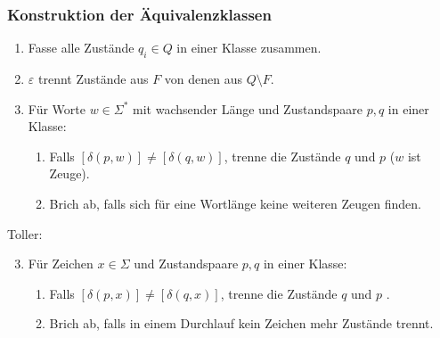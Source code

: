\begin{frame}
 \frametitle{Konstruktion der Äquivalenzklassen}
 \begin{block}{}
  \begin{enumerate}
   \item Fasse alle Zustände $q_i \in Q$ in einer Klasse zusammen.
   \item $\varepsilon$ trennt Zustände aus $F$ von denen aus $Q \setminus F$.
   \item Für Worte $w\in \Sigma^*$ mit wachsender Länge und Zustandspaare $p, q$ in einer Klasse: 
    \begin{enumerate}
    \item Falls $[\delta(p, w)] \neq [\delta(q, w)]$, trenne die Zustände $q$ und $p$ ($w$ ist Zeuge).
    \item Brich ab, falls sich für eine Wortlänge keine weiteren Zeugen finden.
    \end{enumerate}
  \end{enumerate}
 \end{block}
 \pause
 \begin{block}{Toller:}
   \begin{enumerate}
    \setcounter{enumi}{2}
    \item Für Zeichen $x \in \Sigma$ und Zustandspaare $p, q$ in einer Klasse:
     \begin{enumerate}
     \item Falls $[\delta(p, x)] \neq [\delta(q, x)]$, trenne die Zustände $q$ und $p$ .
     \item Brich ab, falls in einem Durchlauf kein Zeichen mehr Zustände trennt.
     \end{enumerate}
   \end{enumerate}
  \end{block}
\end{frame}
